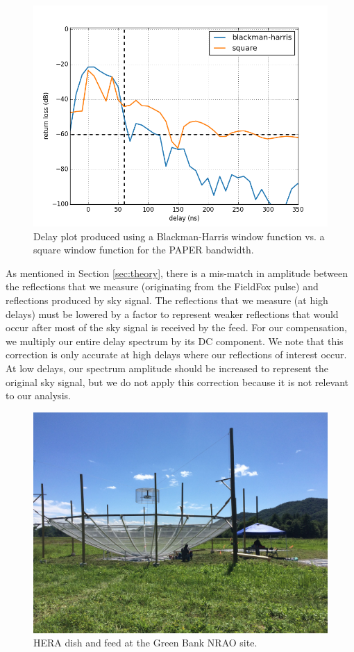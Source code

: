 \documentclass[12pt,preprint]{aastex}
\begin{document}
\begin{figure}
\centering
\includegraphics[totalheight=0.5\textheight]{plots/bh_vs_sq.png}
\caption{Delay plot produced using a Blackman-Harris window function vs. a square window function for the PAPER bandwidth.}
\label{fig:window}
\end{figure}

As mentioned in Section \ref{sec:theory}, there is a mis-match in amplitude between the reflections that we measure (originating from the FieldFox pulse) and reflections produced by sky signal. The reflections that we measure (at high delays) must be lowered by a factor to represent weaker reflections that would occur after most of the sky signal is received by the feed. For our compensation, we multiply our entire delay spectrum by its DC component. We note that this correction is only accurate at high delays where our reflections of interest occur. At low delays, our spectrum amplitude should be increased to represent the original sky signal, but we do not apply this correction because it is not relevant to our analysis.

\begin{figure}
\centering
\includegraphics[trim={2cm 20cm 30cm 15cm},clip, totalheight=0.45\textheight]{plots/heradish.jpg}
\caption{HERA dish and feed at the Green Bank NRAO site.}
\label{fig:heradish}
\end{figure}
\end{document}
